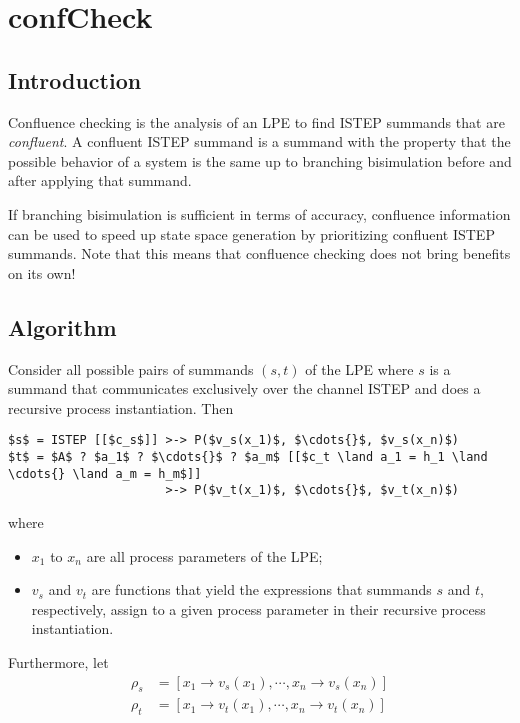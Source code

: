 \chapter{confCheck} \label{confcheck}

\section{Introduction}

Confluence checking is the analysis of an LPE to find ISTEP summands that are \emph{confluent}.
A confluent ISTEP summand is a summand with the property that the possible behavior of a system is the same up to branching bisimulation before and after applying that summand.

If branching bisimulation is sufficient in terms of accuracy, confluence information can be used to speed up state space generation by prioritizing confluent ISTEP summands.
Note that this means that confluence checking does not bring benefits on its own!

\section{Algorithm}

Consider all possible pairs of summands $(s, t)$ of the LPE where $s$ is a summand that communicates exclusively over the channel ISTEP and does a recursive process instantiation.
Then

\begin{lstlisting}[mathescape]
$s$ = ISTEP [[$c_s$]] >-> P($v_s(x_1)$, $\cdots{}$, $v_s(x_n)$)
$t$ = $A$ ? $a_1$ ? $\cdots{}$ ? $a_m$ [[$c_t \land a_1 = h_1 \land \cdots{} \land a_m = h_m$]]
                      >-> P($v_t(x_1)$, $\cdots{}$, $v_t(x_n)$)
\end{lstlisting}

where

\begin{itemize}
\item $x_1$ to $x_n$ are all process parameters of the LPE;
\item $v_s$ and $v_t$ are functions that yield the expressions that summands $s$ and $t$, respectively, assign to a given process parameter in their recursive process instantiation.
\end{itemize}

Furthermore, let
\begin{align*}
\rho_s &= [x_1 \rightarrow v_s(x_1), \cdots{}, x_n \rightarrow v_s(x_n)] \\
\rho_t &= [x_1 \rightarrow v_t(x_1), \cdots{}, x_n \rightarrow v_t(x_n)]
\end{align*}

